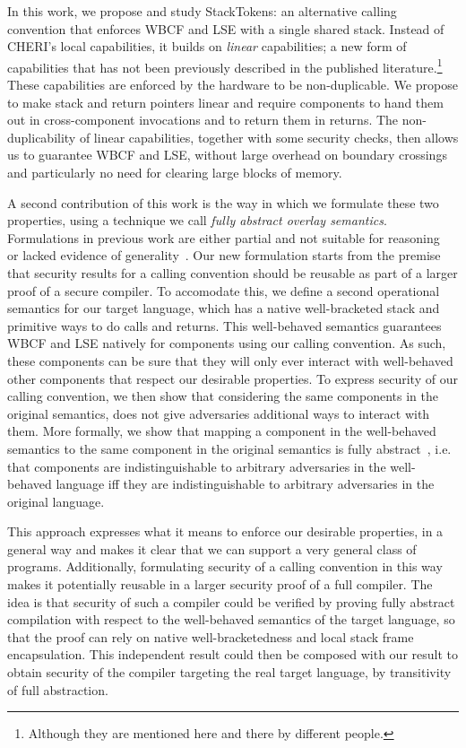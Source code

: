 \documentclass[acmsmall,review,anonymous]{acmart}\settopmatter{printfolios=true,printccs=false,printacmref=false}
\begin{document}
In this work, we propose and study StackTokens: an alternative calling convention that enforces WBCF and LSE with a single shared stack.
Instead of CHERI's local capabilities, it builds on \emph{linear} capabilities; a new form of capabilities that has not been previously described in the published literature.\footnote{Although they are mentioned here and there by different people.} 
These capabilities are enforced by the hardware to be non-duplicable.
We propose to make stack and return pointers linear and require components to hand them out in cross-component invocations and to return them in returns.
The non-duplicability of linear capabilities, together with some security checks, then allows us to guarantee WBCF and LSE, without large overhead on boundary crossings and particularly no need for clearing large blocks of memory.

A second contribution of this work is the way in which we formulate these two properties, using a technique we call \emph{fully abstract overlay semantics}.
Formulations in previous work are either partial and not suitable for reasoning~\cite{abadi_control-flow_2005} or lacked evidence of generality~\cite{skorstengaard_reasoning_2017}.
Our new formulation starts from the premise that security results for a calling convention should be reusable as part of a larger proof of a secure compiler.
To accomodate this, we define a second operational semantics for our target language, which has a native well-bracketed stack and primitive ways to do calls and returns.
This well-behaved semantics guarantees WBCF and LSE natively for components using our calling convention.
As such, these components can be sure that they will only ever interact with well-behaved other components that respect our desirable properties.
To express security of our calling convention, we then show that considering the same components in the original semantics, does not give adversaries additional ways to interact with them. 
More formally, we show that mapping a component in the well-behaved semantics to the same component in the original semantics is fully abstract~\cite{abadi_protection_1999}, i.e. that components are indistinguishable to arbitrary adversaries in the well-behaved language iff they are indistinguishable to arbitrary adversaries in the original language.

This approach expresses what it means to enforce our desirable properties, in a general way and makes it clear that we can support a very general class of programs.
Additionally, formulating security of a calling convention in this way makes it potentially reusable in a larger security proof of a full compiler.
The idea is that security of such a compiler could be verified by proving fully abstract compilation with respect to the well-behaved semantics of the target language, so that the proof can rely on native well-bracketedness and local stack frame encapsulation.
This independent result could then be composed with our result to obtain security of the compiler targeting the real target language, by transitivity of full abstraction.
\end{document}
